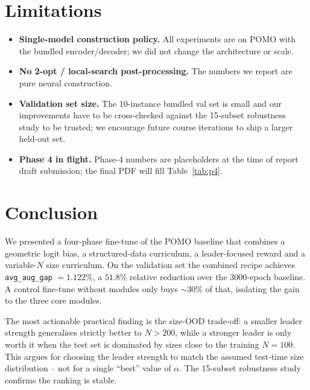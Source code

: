 \documentclass[11pt,a4paper]{article}
\begin{document}
\section{Limitations}
\label{sec:limit}

\begin{itemize}
  \item \textbf{Single-model construction policy.} All experiments are on
        POMO with the bundled encoder/decoder; we did not change the
        architecture or scale.
  \item \textbf{No 2-opt / local-search post-processing.} The numbers we
        report are pure neural construction.
  \item \textbf{Validation set size.} The 10-instance bundled val set
        is small and our improvements have to be cross-checked against
        the 15-subset robustness study to be trusted; we encourage future
        course iterations to ship a larger held-out set.
  \item \textbf{Phase 4 in flight.} Phase-4 numbers are placeholders at
        the time of report draft submission; the final PDF will fill
        Table~\ref{tab:p4}.
\end{itemize}

\section{Conclusion}
\label{sec:concl}

We presented a four-phase fine-tune of the POMO baseline that combines a
geometric logit bias, a structured-data curriculum, a leader-focused
reward and a variable-$N$ size curriculum. On the validation set the
combined recipe achieves \texttt{avg\_aug\_gap} $=1.122\%$, a $51.8\%$
relative reduction over the 3000-epoch baseline. A control fine-tune
without modules only buys $\sim$$30\%$ of that, isolating the gain to the
three core modules.

The most actionable practical finding is the size-OOD trade-off: a smaller
leader strength generalises strictly better to $N>200$, while a stronger
leader is only worth it when the test set is dominated by sizes close to
the training $N=100$. This argues for choosing the leader strength to
match the assumed test-time size distribution -- not for a single
``best'' value of $\alpha$. The 15-subset robustness study confirms the
ranking is stable.
\end{document}
